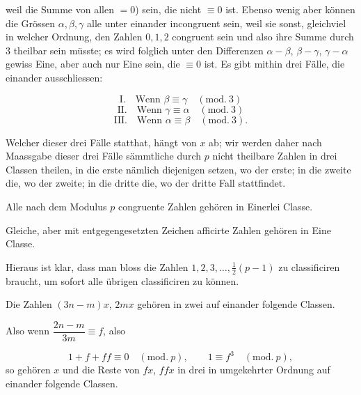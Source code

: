 weil die Summe von allen $=0$) sein, die nicht $\equiv 0$ ist. Ebenso wenig
aber können die Grössen $\alpha, \beta, \gamma$ alle unter einander
incongruent sein, weil sie sonst, gleichviel in welcher Ordnung, den Zahlen
$0, 1, 2$ congruent sein und also ihre Summe durch $3$ theilbar sein
müsste; es wird folglich unter den Differenzen $\alpha-\beta$,
$\beta-\gamma$, $\gamma-\alpha$ gewiss Eine, aber auch nur Eine sein, die
$\equiv 0$ ist. Es gibt mithin drei Fälle, die einander ausschliessen:

\[
\text{I.} \quad \text{Wenn } \beta \equiv \gamma \quad(\mathrm{mod.}\ 3)
\]
\[
\text{II.} \quad \text{Wenn } \gamma \equiv \alpha \quad(\mathrm{mod.}\ 3)
\]
\[
\text{III.} \quad \text{Wenn } \alpha \equiv \beta \quad(\mathrm{mod.}\ 3).
\]

Welcher dieser drei Fälle statthat, hängt von $x$ ab; wir werden daher nach
Maassgabe dieser drei Fälle sämmtliche durch $p$ nicht theilbare Zahlen in
drei Classen theilen, in die erste nämlich diejenigen setzen, wo der
erste; in die zweite die, wo der zweite; in die dritte die, wo der dritte
Fall stattfindet.

 Alle nach dem Modulus $p$ congruente Zahlen gehören in
Einerlei Classe.

 Gleiche, aber mit entgegengesetzten Zeichen afficirte
Zahlen gehören in Eine Classe.

Hieraus ist klar, dass man bloss die Zahlen $1, 2, 3, \ldots,
\frac{1}{2}(p-1)$ zu classificiren braucht, um sofort alle übrigen
classificiren zu können.

 Die Zahlen $(3n-m)x$, $2mx$ gehören in zwei auf einander
folgende Classen.

 Also wenn $\dfrac{2n-m}{3m} \equiv f$, also

\[
1+f+ff \equiv 0 \quad(\mathrm{mod.}\ p), \qquad 1 \equiv f^3 \quad(\mathrm{mod.}\ p),
\]
\noindent so gehören $x$ und die Reste von $fx$, $ffx$ in drei in umgekehrter
Ordnung auf einander folgende Classen.

